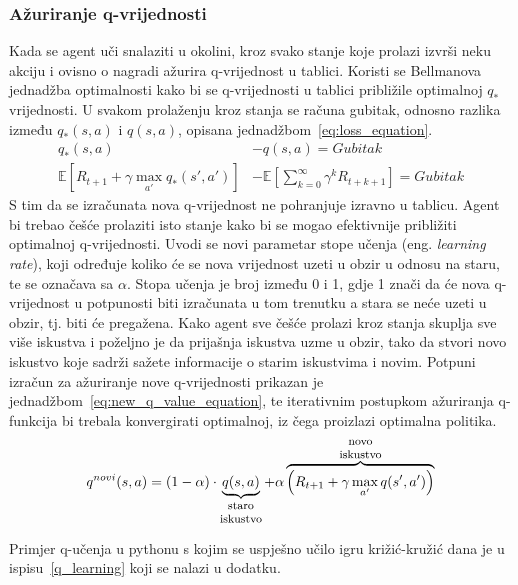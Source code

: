 \subsubsection{Ažuriranje q-vrijednosti}
Kada se agent uči snalaziti u okolini, kroz svako stanje koje prolazi izvrši neku akciju i ovisno o nagradi ažurira q-vrijednost u tablici. Koristi se Bellmanova jednadžba optimalnosti kako bi se q-vrijednosti u tablici približile optimalnoj $q_*$ vrijednosti. U svakom prolaženju kroz stanja se računa gubitak, odnosno razlika između $q_*(s,a)$ i $q(s, a)$, opisana jednadžbom~\ref{eq:loss_equation}. 
\begin{equation}\label{eq:loss_equation}
\begin{split}
q_*(s, a) &- q(s, a) = Gubitak \\
\mathbb{E}\left[R_{t+1} + \gamma\max_{a'}q_*(s', a')\right] &- 
\mathbb{E}\left[\sum_{k=0}^{\infty}\gamma^kR_{t+k+1}\right] = Gubitak
\end{split}
\end{equation}
S tim da se izračunata nova q-vrijednost ne pohranjuje izravno u tablicu. Agent bi trebao češće prolaziti isto stanje kako bi se mogao efektivnije približiti optimalnoj q-vrijednosti. Uvodi se novi parametar stope učenja (eng. \textit{learning rate}), koji određuje koliko će se nova vrijednost uzeti u obzir u odnosu na staru, te se označava sa  $\alpha$. Stopa učenja je broj između 0 i 1, gdje 1 znači da će nova q-vrijednost u potpunosti biti izračunata u tom trenutku a stara se neće uzeti u obzir, tj. biti će pregažena. Kako agent sve češće prolazi kroz stanja skuplja sve više iskustva i poželjno je da prijašnja iskustva uzme u obzir, tako da stvori novo iskustvo koje sadrži sažete informacije o starim iskustvima i novim. Potpuni izračun za ažuriranje nove q-vrijednosti prikazan je jednadžbom~\ref{eq:new_q_value_equation}, te iterativnim postupkom ažuriranja q-funkcija bi trebala konvergirati optimalnoj, iz čega proizlazi optimalna politika.
\begin{equation}\label{eq:new_q_value_equation}
q^{novi}(s, a) = (1 - \alpha) \cdot \underbrace{q(s, a)}_{\parbox{3em}{\footnotesize\centering staro iskustvo}} + \alpha
\overbrace{\left(R_{t+1} + \gamma\max_{a'}q(s', a')\right)}^{\parbox{3em}{\footnotesize\centering novo iskustvo}}
\end{equation}

Primjer q-učenja u pythonu s kojim se uspješno učilo igru križić-kružić dana je u ispisu~\ref{q_learning} koji se nalazi u dodatku.

